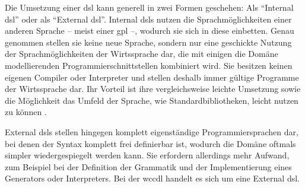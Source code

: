     Die Umsetzung einer \gls{dsl} kann generell in zwei Formen geschehen:
    Als "`Internal \gls{dsl}"' oder als "`External \gls{dsl}"'.
    Internal \glspl{dsl} nutzen die Sprachmöglichkeiten einer anderen Sprache
    -- meist einer \gls{gpl} --, wodurch sie sich in diese einbetten.
    Genau genommen stellen sie keine neue Sprache,
    sondern nur eine geschickte Nutzung der Sprachmöglichkeiten
    der Wirtssprache dar, die mit einigen die Domäne modellierenden Programmierschnittstellen kombiniert wird.
    Sie besitzen keinen eigenen Compiler oder Interpreter und stellen deshalb immer gültige Programme
    der Wirtssprache dar.
    Ihr Vorteil ist ihre vergleichsweise leichte Umsetzung sowie die Möglichkeit das Umfeld der Sprache,
    wie Standardbibliotheken, leicht nutzen zu können
    \cite[Kapitel 2.8.1]{voelter:DslEngineering}.

    External \glspl{dsl} stellen hingegen komplett eigenständige Programmiersprachen dar,
    bei denen der Syntax komplett frei definierbar ist,
    wodurch die Domäne oftmals simpler wiedergespiegelt werden kann.
    Sie erfordern allerdings mehr Aufwand, zum Beispiel bei der Definition der Grammatik
    und der Implementierung eines Generators oder Interpreters.
    Bei der \gls{wccdl} handelt es sich um eine External \gls{dsl}.
